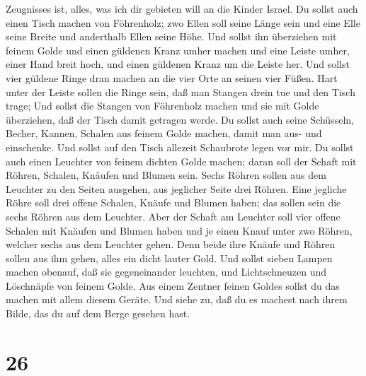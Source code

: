 Zeugnisses ist, alles, was ich dir gebieten will an die Kinder Israel.
 Du sollst auch einen Tisch machen von Föhrenholz; zwo
Ellen soll seine Länge sein und eine Elle seine Breite und anderthalb
Ellen seine Höhe.  Und sollst ihn überziehen mit feinem
Golde und einen güldenen Kranz umher machen  und eine
Leiste umher, einer Hand breit hoch, und einen güldenen Kranz um die
Leiste her.  Und sollst vier güldene Ringe dran machen an
die vier Orte an seinen vier Füßen.  Hart unter der Leiste
sollen die Ringe sein, daß man Stangen drein tue und den Tisch trage;
 Und sollst die Stangen von Föhrenholz machen und sie mit
Golde überziehen, daß der Tisch damit getragen werde.  Du
sollst auch seine Schüsseln, Becher, Kannen, Schalen aus feinem Golde
machen, damit man aus- und einschenke.  Und sollst auf den
Tisch allezeit Schaubrote legen vor mir.  Du sollst auch
einen Leuchter von feinem dichten Golde machen; daran soll der Schaft
mit Röhren, Schalen, Knäufen und Blumen sein.  Sechs Röhren
sollen aus dem Leuchter zu den Seiten ausgehen, aus jeglicher Seite drei
Röhren.  Eine jegliche Röhre soll drei offene Schalen,
Knäufe und Blumen haben; das sollen sein die sechs Röhren aus dem
Leuchter.  Aber der Schaft am Leuchter soll vier offene
Schalen mit Knäufen und Blumen haben  und je einen Knauf
unter zwo Röhren, welcher sechs aus dem Leuchter gehen. 
Denn beide ihre Knäufe und Röhren sollen aus ihm gehen, alles ein dicht
lauter Gold.  Und sollst sieben Lampen machen obenauf, daß
sie gegeneinander leuchten,  und Lichtschneuzen und
Löschnäpfe von feinem Golde.  Aus einem Zentner feinen
Goldes sollst du das machen mit allem diesem Geräte.  Und
siehe zu, daß du es machest nach ihrem Bilde, das du auf dem Berge
gesehen hast.

\hypertarget{section-25}{%
\section{26}\label{section-25}}

